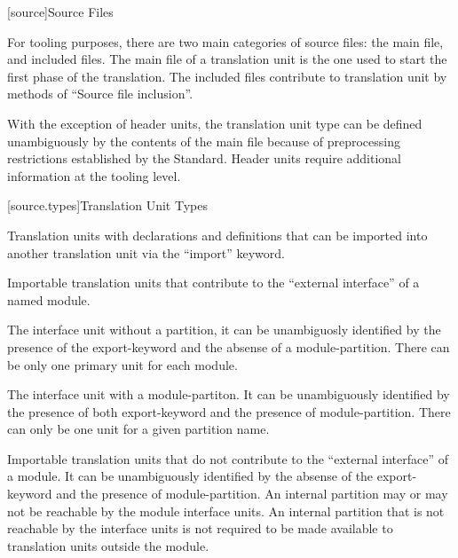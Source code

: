 
[source]{Source Files}

%

\pnum For tooling purposes, there are two main categories of source
files: the main file, and included files. The main file of a
translation unit is the one used to start the first phase of the
translation.  The included files contribute to translation unit by
methods of ``Source file inclusion''.

\pnum With the exception of header units, the translation unit type
can be defined unambiguously by the contents of the main file because
of preprocessing restrictions established by the \Cpp{}
Standard. Header units require additional information at the tooling
level.

[source.types]{Translation Unit Types}

%
%
%
Translation units with declarations and definitions that can be
imported into another translation unit via the ``import'' keyword.

%
%
%
Importable translation units that contribute to the ``external
interface'' of a named module.

%
%
%
The interface unit without a partition, it can be unambiguosly
identified by the presence of the export-keyword and the absense of a
module-partition. There can be only one primary unit for each module.

%
%
%
The interface unit with a module-partiton. It can be unambiguously
identified by the presence of both export-keyword and the presence of
module-partition. There can only be one unit for a given partition
name.

%
%
%
Importable translation units that do not contribute to the ``external
interface'' of a module. It can be unambiguously identified by the
absense of the export-keyword and the presence of module-partition. An
internal partition may or may not be reachable by the module interface
units. An internal partition that is not reachable by the interface
units is not required to be made available to translation units
outside the module.

